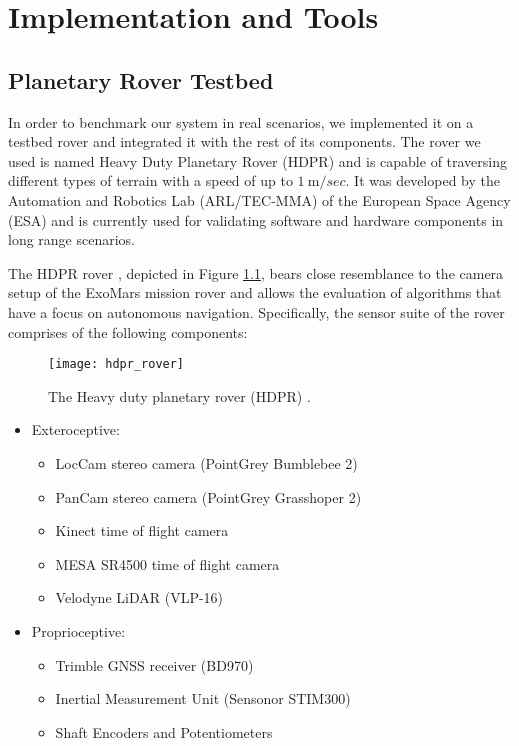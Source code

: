 \label{Chapter3}

\chapter{Implementation and Tools}

\section{Planetary Rover Testbed} \label{hdpr_rover}

In order to benchmark our system in real scenarios, we implemented it
on a testbed rover and integrated it with the rest of its components.
The rover we used is named Heavy Duty Planetary Rover (HDPR) and is
capable of traversing different types of terrain with a speed of up to
$\SI{1}{\m \per sec}$.
It was developed by the Automation and Robotics Lab (ARL/TEC-MMA) of the
European Space Agency (ESA) and is currently used for validating
software and hardware components in long range scenarios.

The HDPR rover \parencite{Boukas2016}, depicted in Figure
\ref{fig:hdpr_rover}, bears close resemblance to the camera setup of the
ExoMars mission rover \parencite{Vago2017} and allows the evaluation
of algorithms that have a focus on autonomous navigation.
Specifically, the sensor suite of the rover comprises of the following
components:

\begin{figure}[h!]
    \centering
    \texttt{[image: hdpr\_rover]}
    \decoRule
    \caption[Heavy duty planetary rover]{
        The Heavy duty planetary rover (HDPR) \parencite{Boukas2016}.
    }
    \label{fig:hdpr_rover}
\end{figure}

\begin{itemize}
    \item Exteroceptive:
        \begin{itemize}
            \item LocCam stereo camera (PointGrey Bumblebee 2)
            \item PanCam stereo camera (PointGrey Grasshoper 2)
            \item Kinect time of flight camera
            \item MESA SR4500 time of flight camera
            \item Velodyne LiDAR (VLP-16)
        \end{itemize}
    \item Proprioceptive:
        \begin{itemize}
            \item Trimble GNSS receiver (BD970)
            \item Inertial Measurement Unit (Sensonor STIM300)
            \item Shaft Encoders and Potentiometers
        \end{itemize}
\end{itemize}

